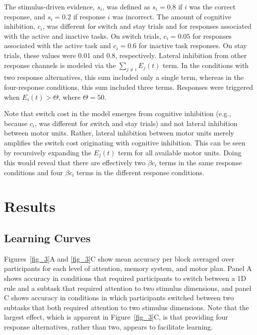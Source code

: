 \documentclass[doc, floatsintext]{apa7}
\begin{document}
The stimulus-driven evidence, $s_i$, was defined as $s_i =
0.8$ if $i$ was the correct response, and $s_{i} = 0.2$ if
response $i$ was incorrect. The amount of cognitive
inhibition, $c_i$, was different for switch and stay trials
and for responses associated with the active and inactive
tasks. On switch trials, $c_i = 0.05$ for responses
associated with the active task and $c_i = 0.6$ for inactive
task responses. On stay trials, these values were 0.01 and
0.8, respectively. Lateral inhibition from other response
channels is modeled via the $\sum_{j \neq i} E_{j}(t)$ term.
In the conditions with two response alternatives, this sum
included only a single term, whereas in the four-response
conditions, this sum included three terms. Responses were
triggered when $E_i(t) > \Theta$, where $\Theta = 50$. 

Note that switch cost in the model emerges from cognitive
inhibition (e.g., because $c_i$, was different for switch
and stay trials) and not lateral inhibition between motor
units. Rather, lateral inhibition between motor units merely
amplifies the switch cost originating with cognitive
inhibition. This can be seen by recursively expanding the
$E_{j}(t)$ term for all available motor units. Doing this
would reveal that there are effectively two $\beta c_i$
terms in the same response conditions and four $\beta c_i$
terms in the different response conditions.

\section{Results}
\subsection{Learning Curves}
Figures~\ref{fig_3}A and \ref{fig_3}C show mean accuracy per
block averaged over participants for each level of
attention, memory system, and motor plan. Panel A shows
accuracy in conditions that required participants to switch
between a 1D rule and a subtask that required attention to
two stimulus dimensions, and panel C shows accuracy in
conditions in which participants switched between two
subtasks that both required attention to two stimulus
dimensions. Note that the largest effect, which is apparent
in Figure~\ref{fig_3}C, is that providing four response
alternatives, rather than two, appears to facilitate
learning.
\end{document}
